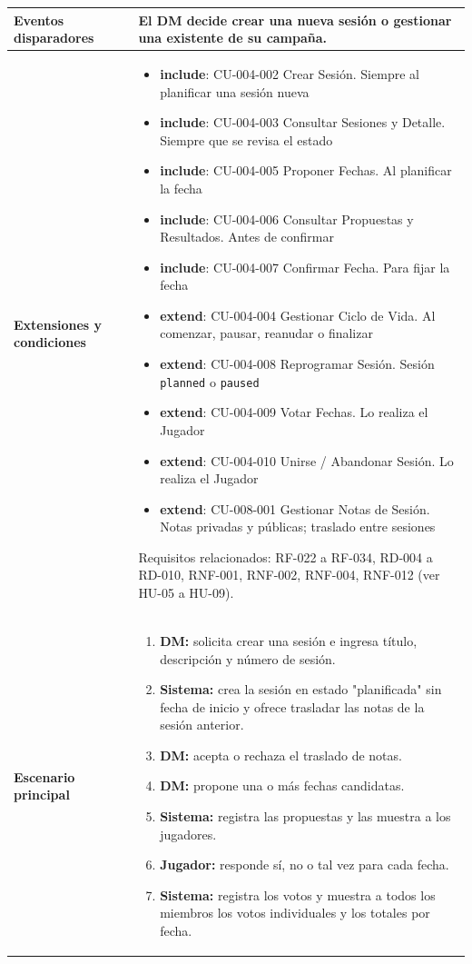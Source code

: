 {\begin{longtable}{|>{\raggedright\arraybackslash\bfseries}p{3.2cm}|>{\raggedright\arraybackslash}p{11.9cm}|}
Eventos disparadores & El DM decide crear una nueva sesión o gestionar una existente de su campaña. \\ \hline
Extensiones y condiciones & \begin{itemize}[itemsep=2pt,topsep=2pt]
\item \textbf{include}: CU-004-002 Crear Sesión. Siempre al planificar una sesión nueva
\item \textbf{include}: CU-004-003 Consultar Sesiones y Detalle. Siempre que se revisa el estado
\item \textbf{include}: CU-004-005 Proponer Fechas. Al planificar la fecha
\item \textbf{include}: CU-004-006 Consultar Propuestas y Resultados. Antes de confirmar
\item \textbf{include}: CU-004-007 Confirmar Fecha. Para fijar la fecha
\item \textbf{extend}: CU-004-004 Gestionar Ciclo de Vida. Al comenzar, pausar, reanudar o finalizar
\item \textbf{extend}: CU-004-008 Reprogramar Sesión. Sesión \texttt{planned} o \texttt{paused}
\item \textbf{extend}: CU-004-009 Votar Fechas. Lo realiza el Jugador
\item \textbf{extend}: CU-004-010 Unirse / Abandonar Sesión. Lo realiza el Jugador
\item \textbf{extend}: CU-008-001 Gestionar Notas de Sesión. Notas privadas y públicas; traslado entre sesiones
\end{itemize}
Requisitos relacionados: RF-022 a RF-034, RD-004 a RD-010, RNF-001, RNF-002, RNF-004, RNF-012 (ver HU-05 a HU-09). \\ \hline
Escenario principal & \begin{enumerate}[itemsep=2pt,topsep=2pt]
\item \textbf{DM:} solicita crear una sesión e ingresa título, descripción y número de sesión.
\item \textbf{Sistema:} crea la sesión en estado "planificada" sin fecha de inicio y ofrece trasladar las notas de la sesión anterior.
\item \textbf{DM:} acepta o rechaza el traslado de notas.
\item \textbf{DM:} propone una o más fechas candidatas.
\item \textbf{Sistema:} registra las propuestas y las muestra a los jugadores.
\item \textbf{Jugador:} responde sí, no o tal vez para cada fecha.
\item \textbf{Sistema:} registra los votos y muestra a todos los miembros los votos individuales y los totales por fecha.

\end{enumerate}
\end{longtable}}
